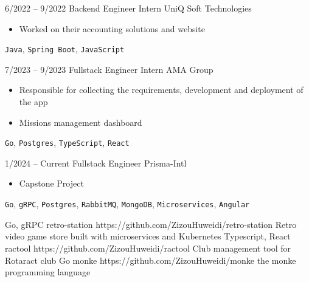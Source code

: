 \documentclass[9pt]{developercv} %
\begin{document}
\vspace{-10 pt}
\begin{entrylist}
	\entry
        {6/2022 -- 9/2022}
		{Backend Engineer Intern}
		{UniQ Soft Technologies}
		{\vspace{-10pt}
        \begin{itemize}[noitemsep,topsep=0pt,parsep=0pt,partopsep=0pt, leftmargin=-1pt]
            \item Worked on their accounting solutions and website
        \end{itemize} 
        \texttt{Java}, \texttt{Spring Boot}, \texttt{JavaScript}}
	\entry
		{7/2023 -- 9/2023}
		{Fullstack Engineer Intern}
		{AMA Group}
		{\vspace{-10pt}
        \begin{itemize}[noitemsep,topsep=0pt,parsep=0pt,partopsep=0pt, leftmargin=-1pt]
            \item Responsible for collecting the requirements, development and deployment of the app
            \item Missions management dashboard
        \end{itemize} 
        \texttt{Go}, \texttt{Postgres}, \texttt{TypeScript}, \texttt{React}}
	\entry
		{1/2024 -- Current}
		{Fullstack Engineer}
		{Prisma-Intl}
		{\vspace{-10pt}
        \begin{itemize}[noitemsep,topsep=0pt,parsep=0pt,partopsep=0pt, leftmargin=-1pt]
            \item Capstone Project
        \end{itemize} 
        \texttt{Go}, \texttt{gRPC}, \texttt{Postgres}, \texttt{RabbitMQ}, \texttt{MongoDB}, \texttt{Microservices}, \texttt{Angular}}
\end{entrylist}

\begin{entrylist}
    \entry
		{Go, gRPC}
		{retro-station}
		{https://github.com/ZizouHuweidi/retro-station}
		{Retro video game store built with microservices and Kubernetes}
    \entry
		{Typescript, React}
		{ractool}
		{https://github.com/ZizouHuweidi/ractool}
		{Club management tool for Rotaract club}
	\entry
		{Go}
		{monke}
		{https://github.com/ZizouHuweidi/monke}
		{the monke programming language}
\end{entrylist}
\end{document}
